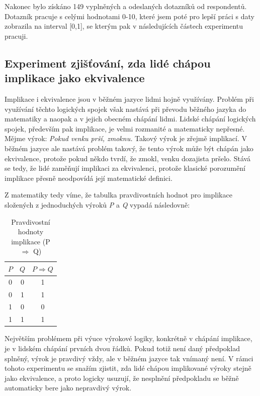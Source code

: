 Nakonec bylo získáno 149 vyplněných a odeslaných dotazník\r u od respondent\r u. Dotazník pracuje s celými hodnotami 0-10, které jsem poté pro lepší práci s daty zobrazila na interval [0,1], se kterým pak v následujících částech experimentu pracuji.

\subsection{Experiment zjiš\v tování, zda lidé chápou implikace jako ekvivalence}
Implikace i ekvivalence jsou v běžném jazyce lidmi hojně využívány. Problém při využívání těchto logických spojek však nastává při převodu běžného jazyka do matematiky a naopak a v jejich obecném chápání lidmi. Lidské chápání logických spojek, především pak implikace, je velmi rozmanité a matematicky nepřesné. Mějme výrok: \textit{\clqq Pokud venku prší, zmoknu.\crqq } Takový výrok je zřejmě implikací. V běžném jazyce ale nastává problém takový, že tento výrok m\r uže být chápán jako ekvivalence, protože pokud někdo tvrdí, že zmokl, venku dozajista pršelo. Stává se tedy, že lidé zamě\v nují implikaci za ekvivalenci, protože klasické porozumění implikace přesně neodpovídá její matematické definici.


Z matematiky tedy víme, že tabulka pravdivostních hodnot pro implikace složených z jednoduchých výrok\r u \textit{P} a \textit{Q} vypadá následovně:
\begin{table}[H]
    \centering
    \begin{tabular}{|c|c|c|}
        \hline
        \(P\) & \(Q\) & \(P \Rightarrow Q\) \\ 
        \hline
        0 & 0 & 1 \\ 
        \hline
        0 & 1 & 1 \\ 
        \hline
        1 & 0 & 0 \\ 
        \hline
        1 & 1 & 1 \\ 
        \hline
    \end{tabular}
    \caption{Pravdivostní hodnoty implikace (P $\Rightarrow$ Q)}
\end{table}

Největším problémem při výuce výrokové logiky, konkrétně v chápání implikace, je v lidském chápání prvních dvou řádk\r u. Pokud totiž není daný předpoklad splněný, výrok je pravdivý vždy, ale v běžném jazyce tak vnímaný není. V rámci tohoto experimentu se snažím zjistit, zda lidé chápou implikované výroky stejně jako ekvivalence, a proto logicky usuzují, že nesplnění předpokladu se běžně automaticky bere jako nepravdivý výrok.

